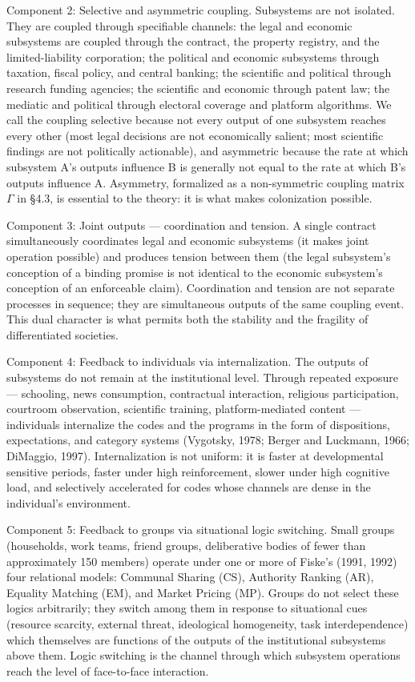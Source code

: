 \documentclass[12pt,a4paper]{article}
\begin{document}
Component 2: Selective and asymmetric coupling. Subsystems are not isolated. They are coupled through specifiable channels: the legal and economic subsystems are coupled through the contract, the property registry, and the limited-liability corporation; the political and economic subsystems through taxation, fiscal policy, and central banking; the scientific and political through research funding agencies; the scientific and economic through patent law; the mediatic and political through electoral coverage and platform algorithms. We call the coupling selective because not every output of one subsystem reaches every other (most legal decisions are not economically salient; most scientific findings are not politically actionable), and asymmetric because the rate at which subsystem A's outputs influence B is generally not equal to the rate at which B's outputs influence A. Asymmetry, formalized as a non-symmetric coupling matrix $\Gamma$ in §4.3, is essential to the theory: it is what makes colonization possible.


Component 3: Joint outputs --- coordination and tension. A single contract simultaneously coordinates legal and economic subsystems (it makes joint operation possible) and produces tension between them (the legal subsystem's conception of a binding promise is not identical to the economic subsystem's conception of an enforceable claim). Coordination and tension are not separate processes in sequence; they are simultaneous outputs of the same coupling event. This dual character is what permits both the stability and the fragility of differentiated societies.


Component 4: Feedback to individuals via internalization. The outputs of subsystems do not remain at the institutional level. Through repeated exposure --- schooling, news consumption, contractual interaction, religious participation, courtroom observation, scientific training, platform-mediated content --- individuals internalize the codes and the programs in the form of dispositions, expectations, and category systems (Vygotsky, 1978; Berger and Luckmann, 1966; DiMaggio, 1997). Internalization is not uniform: it is faster at developmental sensitive periods, faster under high reinforcement, slower under high cognitive load, and selectively accelerated for codes whose channels are dense in the individual's environment.


Component 5: Feedback to groups via situational logic switching. Small groups (households, work teams, friend groups, deliberative bodies of fewer than approximately 150 members) operate under one or more of Fiske's (1991, 1992) four relational models: Communal Sharing (CS), Authority Ranking (AR), Equality Matching (EM), and Market Pricing (MP). Groups do not select these logics arbitrarily; they switch among them in response to situational cues (resource scarcity, external threat, ideological homogeneity, task interdependence) which themselves are functions of the outputs of the institutional subsystems above them. Logic switching is the channel through which subsystem operations reach the level of face-to-face interaction.
\end{document}
